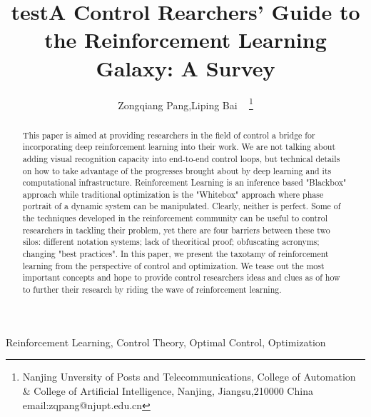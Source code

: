 \documentclass[journal]{IEEEtran}
\begin{document}
    \title{test}
\title{A Control Rearchers' Guide to the Reinforcement Learning Galaxy: A Survey}
\author{ Zongqiang Pang,Liping Bai ~ \thanks{Nanjing Unversity of Posts and Telecommunications, College of Automation \& College of Artificial Intelligence, Nanjing, Jiangsu,210000 China email:zqpang@njupt.edu.cn}}
\maketitle
\begin{abstract}
This paper is aimed at providing researchers in the field of control a bridge for incorporating deep reinforcement learning into their work. We are not talking about adding visual recognition capacity into end-to-end control loops, but technical details on how to take advantage of the progresses brought about by deep learning and its computational infrastructure. Reinforcement Learning is an inference based "Blackbox" approach while traditional optimization is the "Whitebox" approach where phase portrait of a dynamic system can be manipulated. Clearly, neither is perfect. Some of the techniques developed in the reinforcement community can be useful to control researchers in tackling their problem, yet there are four barriers between these two silos: different notation systems; lack of theoritical proof; obfuscating acronyms; changing "best practices". In this paper, we present the taxotamy of reinforcement learning from the perspective of control and optimization. We tease out the most important concepts and hope to provide control researchers ideas and clues as of how to further their research by riding the wave of reinforcement learning.
\end{abstract}
\begin{IEEEkeywords}
Reinforcement Learning, Control Theory, Optimal Control, Optimization
\end{IEEEkeywords}
%
\IEEEpeerreviewmaketitle
\end{document}
